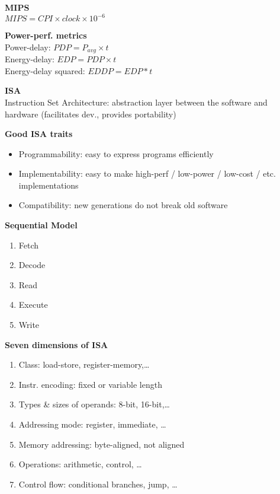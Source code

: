 \documentclass[10pt,letterpaper,landscape]{report}
\newcommand{\boxheight}{21.59cm}
\newcommand{\boxwidth}{8.85cm}
\begin{document}
\begin{small}
{\begin{minipage}[t][\boxheight][c]{\boxwidth}
    \textbf{MIPS}\\
    $MIPS= CPI \times clock \times 10^{-6}$
    
    \textbf{Power-perf. metrics}\\
    Power-delay: $PDP = P_{avg} \times t$\\
    Energy-delay: $EDP = PDP \times t$\\
    Energy-delay squared: $EDDP = EDP * t$
    
    \textbf{ISA}\\
    Instruction Set Architecture: abstraction layer between the software and hardware (facilitates dev., provides portability) 
    
    \textbf{Good ISA traits}
    \begin{itemize}
        \item Programmability: easy to express programs efficiently
        \item Implementability: easy to make high-perf / low-power / low-cost / etc. implementations
        \item Compatibility: new generations do not break old software
    \end{itemize}
    
    \textbf{Sequential Model}
    \begin{enumerate}
        \item Fetch
        \item Decode
        \item Read
        \item Execute
        \item Write
    \end{enumerate}
    
    \textbf{Seven dimensions of ISA}
    \begin{enumerate}
        \item Class: load-store, register-memory,\dots
        \item Instr. encoding: fixed or variable length
        \item Types \& sizes of operands: 8-bit, 16-bit,\dots
        \item Addressing mode: register, immediate, \dots
        \item Memory addressing: byte-aligned, not aligned
        \item Operations: arithmetic, control, \dots
        \item Control flow: conditional branches, jump, \dots
    \end{enumerate}
    

\end{minipage}}
\end{small}
\end{document}
